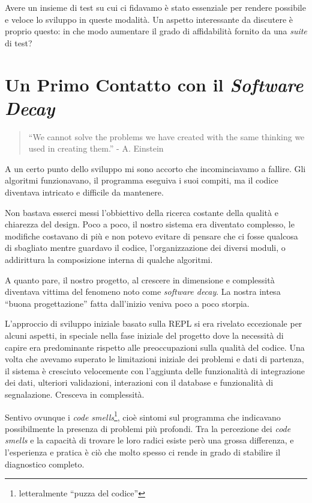 \documentclass[12pt]{report}
\begin{document}
Avere un insieme di test su cui ci fidavamo è stato essenziale per
rendere possibile e veloce lo sviluppo in queste modalità. Un aspetto
interessante da discutere è proprio questo: in che modo aumentare il
grado di affidabilità fornito da una \textit{suite} di test?



% 
\chapter{Un Primo Contatto con il \textit{Software Decay}}

\begin{quote}
``We cannot solve the problems we have created
with the same thinking we used in creating them.'' - A. Einstein
\end{quote}

A un certo punto dello sviluppo mi sono accorto che incominciavamo a fallire. 
Gli algoritmi funzionavano, il programma eseguiva i suoi compiti, ma il
codice diventava intricato e difficile da mantenere.

Non bastava esserci messi l'obbiettivo della ricerca costante della qualità e 
chiarezza del design. Poco a poco, il nostro sistema era diventato complesso, 
le modifiche costavano di più e non potevo evitare di pensare che ci fosse 
qualcosa di sbagliato mentre guardavo il codice, l'organizzazione dei diversi 
moduli, o addirittura la composizione interna di qualche algoritmi. 

A quanto pare, il nostro progetto, al crescere in dimensione e complessità 
diventava vittima del fenomeno noto come \textit{software decay}.
La nostra intesa ``buona progettazione'' fatta 
dall'inizio veniva poco a poco storpia.

L'approccio di sviluppo iniziale basato sulla REPL si era rivelato eccezionale 
per alcuni aspetti, in speciale nella fase iniziale del progetto dove la 
necessità di capire era predominante rispetto alle preoccupazioni sulla 
qualità del codice. Una volta che avevamo superato le limitazioni iniziale dei 
problemi e dati di partenza, il sistema è cresciuto velocemente con l'aggiunta 
delle funzionalità di integrazione dei dati, ulteriori validazioni, interazioni 
con il database e funzionalità di segnalazione. Cresceva in complessità. 

Sentivo ovunque i \textit{code smells}\footnote{
letteralmente ``puzza del codice''}, cioè sintomi sul programma che indicavano 
possibilmente la presenza di problemi più profondi. Tra la percezione dei 
\textit{code smells} e la capacità di trovare le loro radici esiste però una
grossa differenza, e l'esperienza e pratica è ciò che molto spesso ci rende
in grado di stabilire il diagnostico completo.
\end{document}
